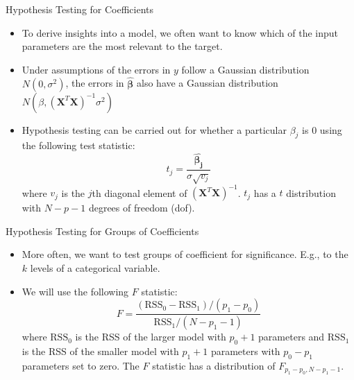 \documentclass[aspectratio=169]{beamer}
\let \vec \mathbf
\begin{document}
\begin{frame}{Hypothesis Testing for Coefficients}
    \begin{itemize}
        \item To derive insights into a model, we often want to know which of the input parameters are the most relevant to the target.
        \item Under assumptions of the errors in $y$ follow a Gaussian distribution $N(0, \sigma^2)$, the errors in $\hat{\bm{\beta}}$ also have a Gaussian distribution $N(\beta, (\vec{X}^T \vec{X})^{-1} \sigma^2)$
        \item Hypothesis testing can be carried out for whether a particular $\beta_j$ is 0 using the following test statistic:
        \begin{equation*}
        t_j = \frac{\hat{\bm{\beta_j}}}{\sigma\sqrt{v_j}}
        \end{equation*}
        where $v_j$ is the $j$th diagonal element of $(\vec{X}^T \vec{X})^{-1}$. $t_j$ has a $t$ distribution with $N-p-1$ degrees of freedom (dof).
    \end{itemize}
\end{frame} 


\begin{frame}{Hypothesis Testing for Groups of Coefficients}
    \begin{itemize}
        \item More often, we want to test groups of coefficient for significance. E.g., to the $k$ levels of a categorical variable.
        \item We will use the following $F$ statistic:
        \begin{equation*}
        F = \frac{(\mathrm{RSS}_0 - \mathrm{RSS}_1)/(p_1-p_0)}{\mathrm{RSS}_1/(N-p_1-1)}
        \end{equation*}
        where $\mathrm{RSS}_0$ is the RSS of the larger model with $p_0 + 1$ parameters and $\mathrm{RSS}_1$ is the RSS of the smaller model with $p_1 + 1$ parameters with $p_0 - p_1$ parameters set to zero. The $F$ statistic has a distribution of $F_{p_1-p_0,N-p_1-1}$.
    \end{itemize}
\end{frame} 
\end{document}
